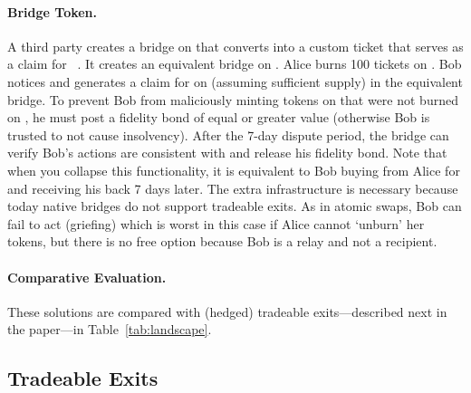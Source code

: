 
\paragraph*{Bridge Token.} A third party creates a bridge on \layertwo that converts \ethtwo into a custom ticket that serves as a claim for \ethtwo~\cite{Whi21}. It creates an equivalent bridge on \layerone. Alice burns 100 tickets on \layertwo. Bob notices and generates a claim for \ethone on \layerone (assuming sufficient supply) in the equivalent \layerone bridge. To prevent Bob from maliciously minting tokens on \layerone that were not burned on \layertwo, he must post a fidelity bond of equal or greater value (otherwise Bob is trusted to not cause insolvency). After the 7-day dispute period, the \layerone bridge can verify Bob's actions are consistent with \layertwo and release his fidelity bond. Note that when you collapse this functionality, it is equivalent to Bob buying \ethxx from Alice for \ethone and receiving his \ethone back 7 days later. The extra infrastructure is necessary because today native bridges do not support tradeable exits. As in atomic swaps, Bob can fail to act (griefing) which is worst in this case if Alice cannot `unburn' her tokens, but there is no free option because Bob is a relay and not a recipient. 

\paragraph*{Comparative Evaluation.} These solutions are compared with (hedged) tradeable exits---described next in the paper---in Table~\ref{tab:landscape}.
 

\subsection{Tradeable Exits} 
\label{sec:tradeablexits}

